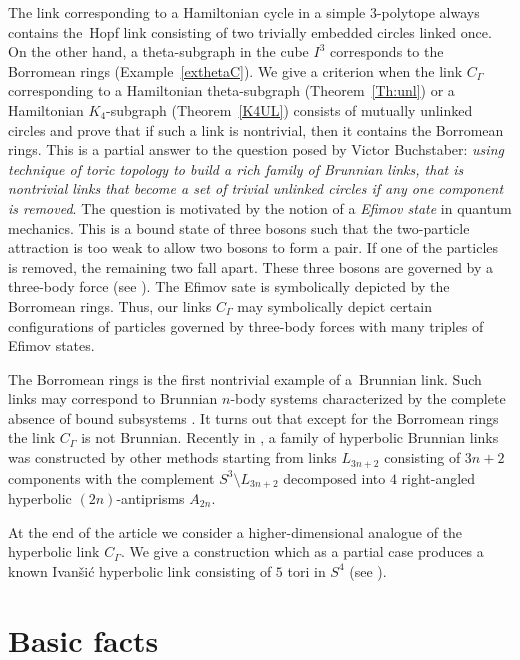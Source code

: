 \documentclass[12pt]{amsart}
\theoremstyle{definition}
\theoremstyle{remark}
\begin{document}
The link corresponding to a Hamiltonian cycle in a simple $3$-polytope always contains the~Hopf link
consisting of two trivially embedded circles linked once. On the other hand, a theta-subgraph in the cube $I^3$
corresponds to the Borromean rings (Example~\ref{exthetaC}). We give a criterion 
when the link $C_\Gamma$ corresponding to a Hamiltonian theta-subgraph (Theorem~\ref{Th:unl}) or a 
Hamiltonian $K_4$-subgraph (Theorem~\ref{K4UL}) consists of mutually unlinked circles and prove that if
such a link is nontrivial, then it contains the Borromean rings. This is a partial answer to the question posed by Victor Buchstaber: {\it using technique of toric topology to build a rich family of Brunnian links, that is nontrivial links that become a set of trivial unlinked circles if any one component is removed}.  The question is motivated by the notion 
of a {\it Efimov state} \cite{E70} in  quantum mechanics. This is a bound state of three bosons such that the two-particle attraction is too weak to allow two bosons to form a pair. If one of the particles is removed, the remaining two fall apart. These three
bosons are governed by a three-body force (see \cite{EENNST25}). The Efimov sate is  symbolically depicted by the Borromean rings. Thus, our links $C_\Gamma$ may symbolically depict certain configurations of particles governed by three-body forces
with many triples of Efimov states. 

The Borromean rings is the first nontrivial  example of a~Brunnian link. Such links may correspond to Brunnian $n$-body
systems characterized by the complete absence of bound subsystems \cite{YFJ11}.
It turns out that except for the Borromean rings the link $C_\Gamma$ is not Brunnian. 
Recently in \cite{RV25}, a family of hyperbolic Brunnian links was constructed by other methods
starting from links $L_{3n+2}$ consisting of $3n+2$ components
with the complement $S^3\setminus L_{3n+2}$ decomposed into $4$ right-angled hyperbolic $(2n)$-antiprisms $A_{2n}$.

At the end of the article we consider a higher-dimensional analogue of the hyperbolic link $C_\Gamma$. We give a construction
which as a partial case produces a known Ivan\v{s}i\'{c} hyperbolic link consisting of $5$ tori in $S^4$ (see \cite{I04,I12, M24}). 
\section{Basic facts}
\end{document}
